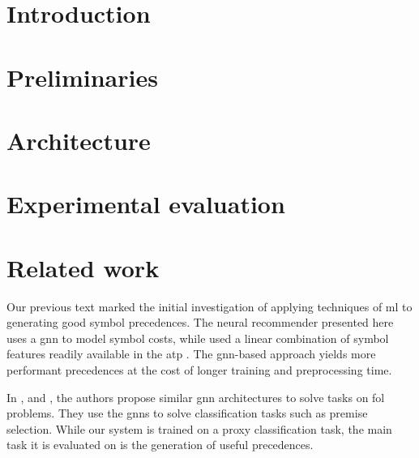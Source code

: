 \documentclass[runningheads]{llncs}
\begin{document}
\maketitle

\begin{abstract}

\end{abstract}

\section{Introduction}



\section{Preliminaries}
\label{sec:preliminaries}


\section{Architecture}
\label{sec:architecture}


\section{Experimental evaluation}
\label{sec:evaluation}


\section{Related work}
\label{sec:related}

Our previous text \cite{DBLP:conf/cade/Bartek020} marked the initial investigation of applying techniques of \acrlong{ml}
to generating good symbol precedences.
The neural recommender presented here uses a \gls{gnn} to model symbol costs,
while \cite{DBLP:conf/cade/Bartek020} used a linear combination of symbol features readily available in the \gls{atp} \Vampire{}.
The \gls{gnn}-based approach yields more performant precedences at the cost of longer training and preprocessing time.

In \cite{Olsak2019}, \cite{Jakubuv2020} and \cite{Rawson2020}, the authors propose similar \gls{gnn} architectures to solve tasks on \gls{fol} problems.
They use the \glspl{gnn} to solve classification tasks such as premise selection.
While our system is trained on a proxy classification task,
the main task it is evaluated on is the generation of useful precedences.
\end{document}
